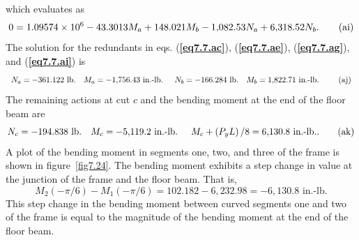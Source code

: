 \documentclass{AeroStructure-ERJohnson}
\begin{document}
\begin{example}
which evaluates as
\begin{equation}
0=1.09574 \times 10^{6}-43.3013 M_{a}+148.021 M_{b}-1{,}082.53 N_{a}+6{,}318.52 N_{b}. \label{eq7.7.ai}\tag{{ai}}
\end{equation}
The solution for the redundants in eqs. (\textbf{\ref{eq7.7.ac}}), (\textbf{\ref{eq7.7.ae}}), (\textbf{\ref{eq7.7.ag}}), and (\textbf{\ref{eq7.7.ai}}) is
\begin{equation}
N_{a}=-361.122 \textrm{ lb} . \quad M_{a}=-1{,}756.43 \text { in.-lb. } \quad N_{b}=-166.284 \textrm{ lb} . \quad M_{b}=1{,}822.71 \text { in.-lb. }\label{eq7.7.aj}\tag{{aj}}
\end{equation}
The remaining actions at cut $c$ and the bending moment at the end of the floor beam are
\begin{equation}
N_{c}=-194.838 \textrm{ lb} . \quad M_{c}=-5{,}119.2 \text { in.-lb. } \quad M_{c}+\left(P_{y} L\right) / 8=6{,}130.8 \text { in.-lb.}. \label{eq7.7.ak}\tag{{ak}}
\end{equation}
A plot of the bending moment in segments one, two, and three of the frame is shown in figure~\ref{fig7.24}. The bending moment exhibits a step change in value at the junction of the frame and the floor beam. That is,
\begin{equation*}
M_{2}(-\pi / 6)-M_{1}(-\pi / 6)=102.182-6{,}232.98=-6{,}130.8 \text { in.-lb.}
\end{equation*}
This step change in the bending moment between curved segments one and two of the frame is equal to the magnitude of the bending moment at the end of the floor beam.
\end{example}

\pagebreak

{\def\thefigure{7.24}
}
\end{document}
